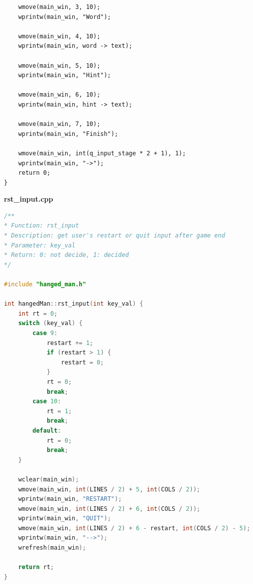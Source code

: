 \documentclass{article}
\begin{document}
\begin{lstlisting}
    wmove(main_win, 3, 10);
    wprintw(main_win, "Word");

    wmove(main_win, 4, 10);
    wprintw(main_win, word -> text);

    wmove(main_win, 5, 10);
    wprintw(main_win, "Hint");

    wmove(main_win, 6, 10);
    wprintw(main_win, hint -> text);

    wmove(main_win, 7, 10);
    wprintw(main_win, "Finish");

    wmove(main_win, int(q_input_stage * 2 + 1), 1);
    wprintw(main_win, "->");
    return 0;
}
        \end{lstlisting}

        \textbf{rst\_input.cpp}
        \begin{lstlisting}[language={cpp}]
/**
* Function: rst_input
* Description: get user's restart or quit input after game end
* Parameter: key_val
* Return: 0: not decide, 1: decided
*/

#include "hanged_man.h"

int hangedMan::rst_input(int key_val) {
    int rt = 0;
    switch (key_val) {
        case 9:
            restart += 1;
            if (restart > 1) {
                restart = 0;
            }
            rt = 0;
            break;
        case 10:
            rt = 1;
            break;
        default:
            rt = 0;
            break;
    }

    wclear(main_win);
    wmove(main_win, int(LINES / 2) + 5, int(COLS / 2));
    wprintw(main_win, "RESTART");
    wmove(main_win, int(LINES / 2) + 6, int(COLS / 2));
    wprintw(main_win, "QUIT");
    wmove(main_win, int(LINES / 2) + 6 - restart, int(COLS / 2) - 5);
    wprintw(main_win, "-->");
    wrefresh(main_win);

    return rt;
}
        \end{lstlisting}
        
\end{document}
